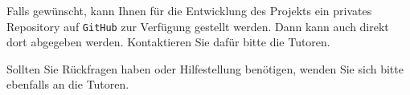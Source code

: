 \documentclass[10pt,a4paper]{article}
\begin{document}
Falls gewünscht, kann Ihnen für die Entwicklung des Projekts ein privates Repository auf \texttt{GitHub} zur Verfügung gestellt werden. Dann kann auch direkt dort abgegeben werden. Kontaktieren Sie dafür bitte die Tutoren.\bigskip

Sollten Sie Rückfragen haben oder Hilfestellung benötigen, wenden Sie sich bitte ebenfalls an die Tutoren.
\end{document}
